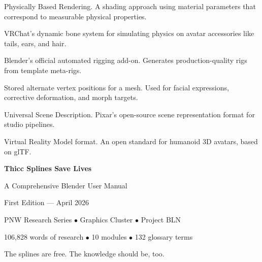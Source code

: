 \documentclass[11pt,letterpaper,twoside,openright]{book}
\begin{document}
\begin{description}[leftmargin=2em, style=nextline]
  \item[\textsf{PBR}] Physically Based Rendering. A shading approach using material parameters that correspond to measurable physical properties.
  \item[\textsf{PhysBones}] VRChat's dynamic bone system for simulating physics on avatar accessories like tails, ears, and hair.
  \item[\textsf{Rigify}] Blender's official automated rigging add-on. Generates production-quality rigs from template meta-rigs.
  \item[\textsf{Shape Key}] Stored alternate vertex positions for a mesh. Used for facial expressions, corrective deformation, and morph targets.
  \item[\textsf{USD}] Universal Scene Description. Pixar's open-source scene representation format for studio pipelines.
  \item[\textsf{VRM}] Virtual Reality Model format. An open standard for humanoid 3D avatars, based on glTF.
\end{description}


\newpage
\thispagestyle{empty}
\vspace*{\fill}
\begin{center}
{\Large\sffamily\textcolor{primary}{\textbf{Thicc Splines Save Lives}}}

\vspace{1em}
{\normalsize\sffamily\textcolor{subtlegray}{A Comprehensive Blender User Manual}}

\vspace{0.5em}
{\normalsize\sffamily\textcolor{subtlegray}{First Edition --- April 2026}}

\vspace{2em}
{\small\sffamily\textcolor{subtlegray}{PNW Research Series $\bullet$ Graphics Cluster $\bullet$ Project BLN}}

\vspace{1em}
{\small\sffamily\textcolor{subtlegray}{106,828 words of research $\bullet$ 10 modules $\bullet$ 132 glossary terms}}

\vspace{2em}
{\small\sffamily\textcolor{accent}{The splines are free. The knowledge should be, too.}}
\end{center}
\vspace*{\fill}
\end{document}
